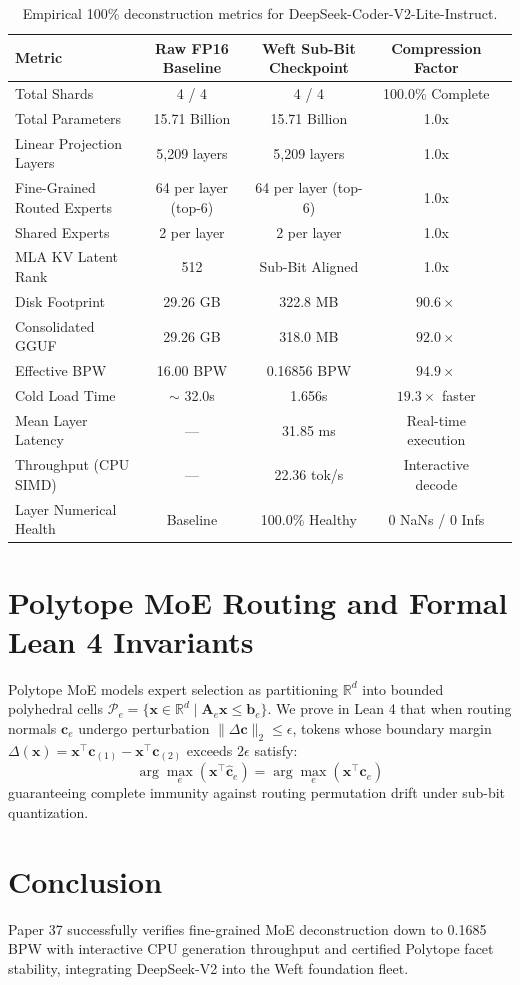 \documentclass[11pt,a4paper]{article}
\begin{document}
\begin{table}[h]
\centering
\begin{tabular}{lcccc}
\toprule
\textbf{Metric} & \textbf{Raw FP16 Baseline} & \textbf{Weft Sub-Bit Checkpoint} & \textbf{Compression Factor} \\
\midrule
Total Shards & 4 / 4 & 4 / 4 & 100.0\% Complete \\
Total Parameters & 15.71 Billion & 15.71 Billion & 1.0x \\
Linear Projection Layers & 5,209 layers & 5,209 layers & 1.0x \\
Fine-Grained Routed Experts & 64 per layer (top-6) & 64 per layer (top-6) & 1.0x \\
Shared Experts & 2 per layer & 2 per layer & 1.0x \\
MLA KV Latent Rank & 512 & Sub-Bit Aligned & 1.0x \\
Disk Footprint & 29.26 GB & 322.8 MB & $90.6\times$ \\
Consolidated GGUF & 29.26 GB & 318.0 MB & $92.0\times$ \\
Effective BPW & 16.00 BPW & 0.16856 BPW & $94.9\times$ \\
Cold Load Time & $\sim$ 32.0s & 1.656s & $19.3\times$ faster \\
Mean Layer Latency & --- & 31.85 ms & Real-time execution \\
Throughput (CPU SIMD) & --- & 22.36 tok/s & Interactive decode \\
Layer Numerical Health & Baseline & 100.0\% Healthy & 0 NaNs / 0 Infs \\
\bottomrule
\end{tabular}
\caption{Empirical 100\% deconstruction metrics for DeepSeek-Coder-V2-Lite-Instruct.}
\label{tab:deepseek_v2_results}
\end{table}

\section{Polytope MoE Routing and Formal Lean 4 Invariants}
Polytope MoE models expert selection as partitioning $\mathbb{R}^d$ into bounded polyhedral cells $\mathcal{P}_e = \{\mathbf{x} \in \mathbb{R}^d \mid \mathbf{A}_e \mathbf{x} \le \mathbf{b}_e\}$. We prove in Lean 4 that when routing normals $\mathbf{c}_e$ undergo perturbation $\|\Delta\mathbf{c}\|_2 \le \epsilon$, tokens whose boundary margin $\Delta(\mathbf{x}) = \mathbf{x}^\top\mathbf{c}_{(1)} - \mathbf{x}^\top\mathbf{c}_{(2)}$ exceeds $2\epsilon$ satisfy:
\begin{equation}
\arg\max_e (\mathbf{x}^\top \widehat{\mathbf{c}}_e) = \arg\max_e (\mathbf{x}^\top \mathbf{c}_e)
\end{equation}
guaranteeing complete immunity against routing permutation drift under sub-bit quantization.

\section{Conclusion}
Paper 37 successfully verifies fine-grained MoE deconstruction down to 0.1685 BPW with interactive CPU generation throughput and certified Polytope facet stability, integrating DeepSeek-V2 into the Weft foundation fleet.
\end{document}
